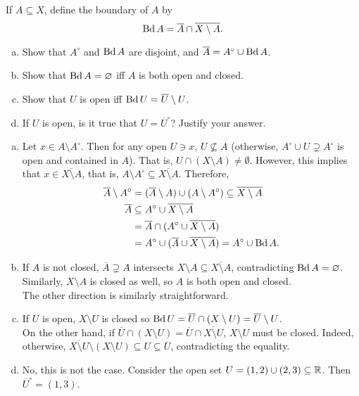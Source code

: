 	\setcounter{exercise}{18}
	\begin{exercise}
		If $A\subseteq X$, define the boundary of $A$ by
		\[ \operatorname{Bd} A = \overline{A} \cap \overline{X\setminus A}.  \]
		\begin{enumerate}[(a)]
			\item Show that $A^\circ$ and $\operatorname{Bd} A$ are disjoint, and $\overline{A} = A^\circ \cup \operatorname{Bd} A$.
			\item Show that $\operatorname{Bd} A = \varnothing$ iff $A$ is both open and closed.
			\item Show that $U$ is open iff $\operatorname{Bd} U = \overline{U}\setminus U$.
			\item If $U$ is open, is it true that $U = \overline{U}^\circ$? Justify your answer.
		\end{enumerate}
	\end{exercise}
	\begin{solution*}
		\begin{enumerate}[(a)]
			\item Let $x\in A\setminus A^\circ$. Then for any open $U\ni x$, $U\not\subseteq A$ (otherwise, $A^\circ\cup U\supsetneq A^\circ$ is open and contained in $A$). That is, $U\cap (X\setminus A) \neq \emptyset$. However, this implies that $x\in \overline{X\setminus A}$, that is, $A\setminus A^\circ\subseteq \overline{X\setminus A}$. Therefore,
			\begin{align*}
				\overline{A}\setminus A^\circ &= (\overline{A}\setminus A) \cup (A\setminus A^\circ) \subseteq \overline{X\setminus A} \\
				\overline{A} &\subseteq A^\circ \cup \overline{X\setminus A} \\
					&= \overline{A} \cap (A^\circ \cup \overline{X\setminus A}) \\
					&= A^\circ \cup (\overline{A} \cup \overline{X\setminus A}) = A^\circ \cup \operatorname{Bd} A.
			\end{align*} 

			\item If $A$ is not closed, $\overline{A}\supsetneq A$ intersects $X\setminus A\subseteq \overline{X\setminus A}$, contradicting $\operatorname{Bd} A = \varnothing$. Similarly, $X\setminus A$ is closed as well, so $A$ is both open and closed.\\
			The other direction is similarly straightforward.

			\item If $U$ is open, $X\setminus U$ is closed so $\operatorname{Bd} U = \overline{U} \cap (X\setminus U) = \overline{U} \setminus U$.\\
			On the other hand, if $\overline{U}\cap (X\setminus U) = \overline{U}\cap \overline{X\setminus U}$, $X\setminus U$ must be closed. Indeed, otherwise, $\overline{X\setminus U} \setminus (X\setminus U) \subseteq U \subseteq \overline{U}$, contradicting the equality.

			\item No, this is not the case. Consider the open set $U=(1,2)\cup(2,3)\subseteq\mathbb{R}$. Then $\overline{U}^\circ=(1,3)$.
		\end{enumerate}
	\end{solution*}

